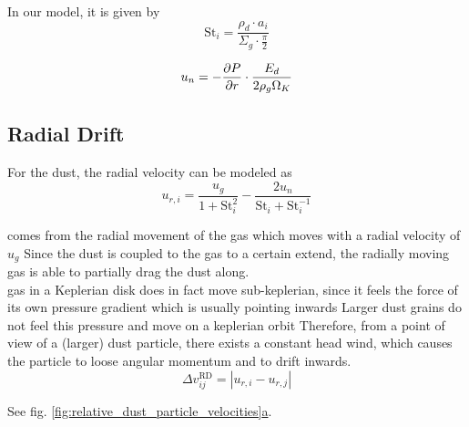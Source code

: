     In our model, it is given by
    \begin{equation}
        \text{St}_i=\frac{\rho_d\cdot a_i}{\Sigma_g\cdot\frac{\pi}{2}}
    \end{equation}

    \begin{equation}
        u_{n}
        =-\frac{\partial P}{\partial r}\cdot\frac{E_d}{2\rho_g\Omega_K}
    \end{equation}

    \subsection{Radial Drift}

        For the dust, the radial velocity can be modeled as
        \begin{equation}
            u_{r,i}
            =\frac{u_{g}}{1+\text{St}_i^2}-\frac{2u_{n}}{\text{St}_i+\text{St}_i^{-1}}
        \end{equation}


            comes from the radial movement of the gas 
            which moves with a radial velocity of $u_g$
            Since the dust is coupled to the gas to a certain extend, 
            the radially moving gas is able to partially drag the dust along. \\

             gas in a Keplerian disk does in fact move sub-keplerian, 
             since it feels the force of its own pressure gradient which is usually pointing inwards
             Larger dust grains do not feel this pressure and move on a keplerian orbit
             Therefore, from a point of view of a (larger) dust particle, 
             there exists a constant head wind, 
             which causes the particle to loose angular momentum and to drift inwards. \\

        \begin{equation}
            \Delta v_{ij}^\text{RD}
            =|u_{r,i}-u_{r,j}|
        \end{equation}
    
        See fig.
        \hyperref[fig:relative_dust_particle_velocities]{\ref*{fig:relative_dust_particle_velocities}a}.

